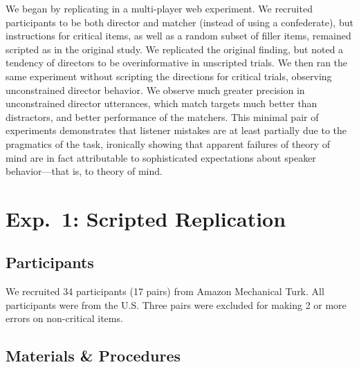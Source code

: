 \documentclass[10pt,letterpaper]{article}
\begin{document}
We began by replicating  in a multi-player web experiment. We recruited participants to be both director and matcher (instead of using a confederate), but instructions for critical items, as well as a random subset of filler items, remained scripted as in the original study. We replicated the original finding, but noted a tendency of directors to be overinformative in unscripted trials. We then ran the same experiment without scripting the directions for critical trials, observing unconstrained director behavior. We observe much greater precision in unconstrained director utterances, which match targets much better than distractors, and better performance of the matchers. This minimal pair of experiments demonstrates that listener mistakes are at least partially due to the pragmatics of the task, ironically showing that apparent failures of theory of mind are in fact attributable to sophisticated expectations about speaker behavior---that is, to theory of mind.


\section{Exp.~1: Scripted Replication}
\label{sec:Exp1}

\subsection{Participants}

We recruited 34 participants (17 pairs) from Amazon Mechanical Turk. All participants were from the U.S. Three pairs were excluded for making 2 or more errors on non-critical items.

\subsection{Materials \& Procedures}
\end{document}
